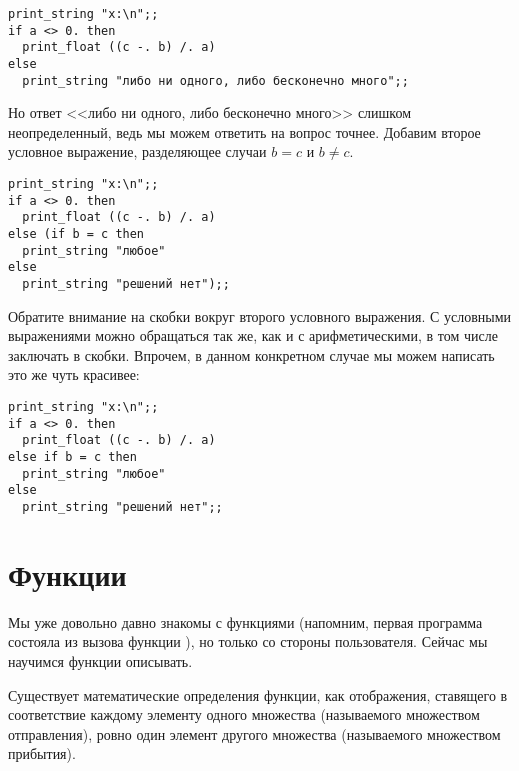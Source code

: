\begin{verbatim}
print_string "x:\n";;
if a <> 0. then 
  print_float ((c -. b) /. a)
else 
  print_string "либо ни одного, либо бесконечно много";;
\end{verbatim}

Но ответ <<либо ни одного, либо бесконечно много>> слишком неопределенный,
ведь мы можем ответить на вопрос точнее.
Добавим второе условное выражение, разделяющее случаи $b = c$ и $b \ne c$.

\begin{verbatim}
print_string "x:\n";;
if a <> 0. then 
  print_float ((c -. b) /. a)
else (if b = c then
  print_string "любое"
else
  print_string "решений нет");;
\end{verbatim}

Обратите внимание на скобки вокруг второго условного выражения. 
С условными выражениями можно обращаться так же, как и с арифметическими, 
в том числе заключать в скобки. 
Впрочем, в данном конкретном случае мы можем написать
это же чуть красивее:

\begin{verbatim}
print_string "x:\n";;
if a <> 0. then 
  print_float ((c -. b) /. a)
else if b = c then
  print_string "любое"
else
  print_string "решений нет";;
\end{verbatim}

%

\section{Функции}

Мы уже довольно давно знакомы с функциями (напомним, первая программа 
состояла из вызова функции ), но только со стороны
пользователя. Сейчас мы научимся функции описывать.

Существует математические определения функции, как отображения, ставящего
в соответствие каждому элементу одного множества (называемого множеством
отправления), ровно один элемент другого множества (называемого множеством
прибытия).

